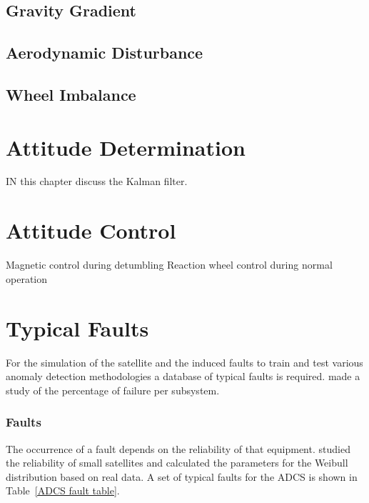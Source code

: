 \subsection{Gravity Gradient}

\subsection{Aerodynamic Disturbance}

\subsection{Wheel Imbalance}

\section{Attitude Determination}
IN this chapter discuss the Kalman filter.

\section{Attitude Control}
Magnetic control during detumbling
Reaction wheel control during normal operation

\section{Typical Faults}
For the simulation of the satellite and the induced faults to train and test various anomaly detection methodologies a database of typical faults is required. \textcite{tafazoli2009study} made a study of the percentage of failure per subsystem. 

\subsubsection{Faults}
The occurrence of a fault depends on the reliability of that equipment. \textcite{Guo2014} studied the reliability of small satellites and calculated the parameters for the Weibull distribution based on real data. A set of typical faults for the ADCS is shown in Table~\ref{ADCS fault table}. 

